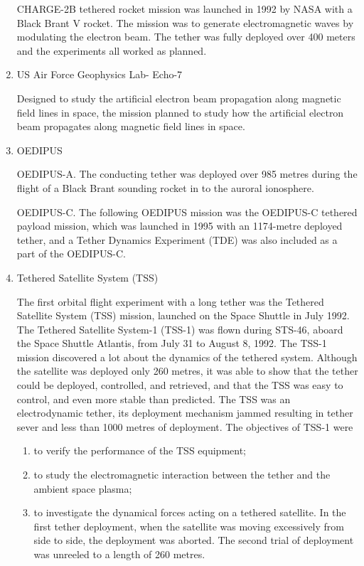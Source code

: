 \begin{enumerate}
CHARGE-2B tethered rocket mission was launched in 1992 by NASA with a Black Brant V rocket. The mission was to generate electromagnetic waves by modulating the electron beam. The tether was fully deployed over 400 meters and the experiments all worked as planned.

\item{US Air Force Geophysics Lab- Echo-7}

Designed to study the artificial electron beam propagation along magnetic field lines in space, the mission planned to study how the artificial electron beam propagates along magnetic field lines in space.
\item{OEDIPUS}

OEDIPUS-A. The conducting tether was deployed over 985 metres during the flight of a Black Brant sounding rocket in to the auroral ionosphere.

OEDIPUS-C. The following OEDIPUS mission was the OEDIPUS-C tethered payload mission, which was launched in 1995 with an 1174-metre deployed tether, and a Tether Dynamics Experiment (TDE) was also included as a part of the OEDIPUS-C.
\item{Tethered Satellite System (TSS)}

The first orbital flight experiment with a long tether was the Tethered Satellite System (TSS) mission, launched on the Space Shuttle in July 1992. The Tethered Satellite System-1 (TSS-1) was flown during STS-46, aboard the Space Shuttle Atlantis, from July 31 to August 8, 1992. The TSS-1 mission discovered a lot about the dynamics of the tethered system. Although the satellite was deployed only 260 metres, it was able to show that the tether could be deployed, controlled, and retrieved, and that the TSS was easy to control, and even more stable than predicted. The TSS was an electrodynamic tether, its deployment mechanism jammed resulting in tether sever and less than 1000 metres of deployment. The objectives of TSS-1 were 
\begin{enumerate}

\item to verify the performance of the TSS equipment; 

\item to study the electromagnetic interaction between the tether and the ambient space plasma; 

\item to investigate the dynamical forces acting on a tethered satellite. In the first tether deployment, when the satellite was moving excessively from side to side, the deployment was aborted. The second trial of deployment was unreeled to a length of 260 metres.


\end{enumerate}
\end{enumerate}
